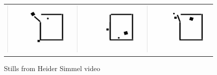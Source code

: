 \def\DevnagVersion{2.15}\documentclass[a4paper, 11pt, notitlepage]{report}
\begin{document}
\begin{figure}[h]
\center
\begin{tabular}{ccc}
\includegraphics[scale=0.15]{image/heider1135.png} &
\includegraphics[scale=0.15]{image/heider1345.png} &
\includegraphics[scale=0.15]{image/heider1810.png}
\end{tabular}
\label{tab:gt}
\caption{Stills from Heider Simmel video}
\end{figure}
\end{document}
